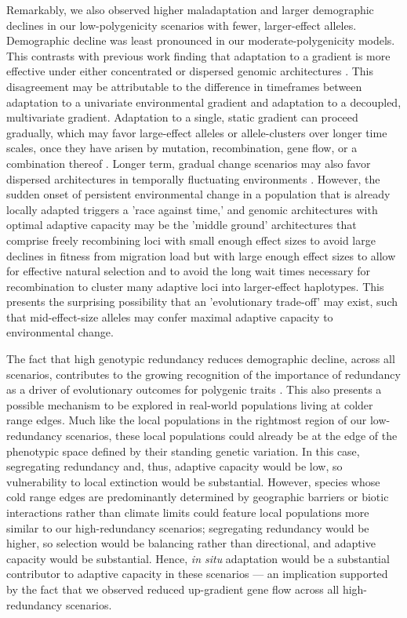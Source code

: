 \documentclass[9pt,twocolumn,twoside,lineno]{new_article}
\begin{document}
Remarkably, we also observed higher maladaptation and larger demographic declines
in our low-polygenicity scenarios with fewer, larger-effect alleles.
Demographic decline was least pronounced
in our moderate-polygenicity models.
This contrasts with previous work finding that adaptation
to a gradient is more effective under either
concentrated or dispersed genomic architectures \cite{yeaman_whitlock}.
This disagreement may be attributable to the
difference in timeframes between adaptation to a univariate environmental gradient
and adaptation to a decoupled, multivariate gradient.
Adaptation to a single, static gradient can proceed gradually,
which may favor large-effect alleles or allele-clusters over longer time scales,
once they have arisen by mutation, recombination, gene flow, or a combination thereof \cite{yeaman_amnat,yeaman_review}. Longer term, gradual change scenarios may also favor dispersed architectures in temporally fluctuating environments \cite{burger,kondrashov,yeaman_review,yeaman_whitlock}.
However, the sudden onset of persistent environmental change 
in a population that is already locally adapted triggers a 'race against time,' 
and genomic architectures with
optimal adaptive capacity may be the 'middle ground' architectures that comprise
freely recombining loci with small enough effect sizes to avoid large declines in fitness from migration load
but with large enough effect sizes to allow for effective natural selection and to avoid the long wait times necessary
for recombination to cluster many adaptive loci into larger-effect haplotypes.
This presents the surprising possibility that an 'evolutionary trade-off' may exist, such
that mid-effect-size alleles may confer maximal adaptive capacity to environmental
change.

The fact that high genotypic redundancy reduces demographic decline,
across all scenarios, contributes to the growing recognition of the importance of redundancy
as a driver of evolutionary outcomes for polygenic traits
\cite{laruson,yeaman_review}.
This also presents a possible mechanism to be explored
in real-world populations living at colder range edges.
Much like the local populations in the rightmost region of our low-redundancy scenarios,
these local populations could already be at the edge of the phenotypic space defined by
their standing genetic variation.
In this case, 
segregating redundancy \cite{laruson} and, thus,
adaptive capacity would be low,
so vulnerability to local extinction would be substantial.
However, species whose cold range edges are predominantly determined by geographic barriers
or biotic interactions rather than climate limits \cite{thomas}
could feature local populations more similar to our high-redundancy scenarios;
segregating redundancy would be higher,
so selection would be balancing rather than directional, and adaptive capacity would be substantial.
Hence, \textit{in situ} adaptation would be a substantial contributor to
adaptive capacity in these scenarios --- an implication supported by the fact that
we observed reduced up-gradient gene flow across all high-redundancy scenarios.
\end{document}
